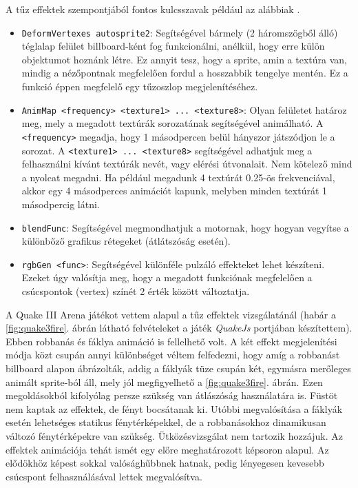 A tűz effektek szempontjából fontos kulcsszavak például az alábbiak \cite{quake3shaderManual}.
\begin{itemize} 
\item
\texttt{DeformVertexes autosprite2}: Segítségével bármely (2 háromszögből álló) téglalap felület billboard-ként fog funkcionálni, anélkül, hogy erre külön objektumot hoznánk létre. Ez annyit tesz, hogy a sprite, amin a textúra van, mindig a nézőpontnak megfelelően fordul a hosszabbik tengelye mentén. Ez a funkció éppen megfelelő egy tűzoszlop megjelenítéséhez.
\item
\texttt{AnimMap <frequency> <texture1> ... <texture8>}: Olyan felületet határoz meg, mely a megadott textúrák sorozatának segítségével animálható. A \texttt{<frequency>} megadja, hogy 1 másodpercen belül hányszor játszódjon le a sorozat. A \texttt{<texture1> ... <texture8>} segítségével adhatjuk meg a felhasználni kívánt textúrák nevét, vagy elérési útvonalait. Nem kötelező mind a nyolcat megadni. Ha például megadunk 4 textúrát 0.25-ös frekvenciával, akkor egy 4 másodperces animációt kapunk, melyben minden textúrát 1 másodpercig látni. 
\item
\texttt{blendFunc}: Segítségével megmondhatjuk a motornak, hogy hogyan vegyítse a különbőző grafikus rétegeket (átlátszóság esetén).
\item
\texttt{rgbGen <func>}: Segítségével különféle pulzáló effekteket lehet készíteni. Ezeket úgy valósítja meg, hogy a megadott funkciónak megfelelően a csúcspontok (vertex) színét 2 érték között változtatja.
\end{itemize}

A Quake III Arena játékot vettem alapul a tűz effektek vizsgálatánál (habár a \ref{fig:quake3fire}. ábrán látható felvételeket a játék \textit{QuakeJs} portjában készítettem). Ebben robbanás és fáklya animáció is fellelhető volt. A két effekt megjelenítési módja közt csupán annyi különbséget véltem felfedezni, hogy amíg a robbanást billboard alapon ábrázolták, addig a fáklyák tüze csupán két, egymásra merőleges animált sprite-ból áll, mely jól megfigyelhető a \ref{fig:quake3fire}. ábrán. Ezen megoldásokból kifolyólag persze szükség van átlászóság használatára is. Füstöt nem kaptak az effektek, de fényt bocsátanak ki. Utóbbi megvalósítása a fáklyák esetén lehetséges statikus fénytérképekkel, de a robbanásokhoz dinamikusan változó fénytérképekre van szükség. Ütközésvizsgálat nem tartozik hozzájuk. Az effektek animációja tehát ismét egy előre meghatározott képsoron alapul. Az elődökhöz képest sokkal valósághűbbnek hatnak, pedig lényegesen kevesebb csúcspont felhasználásával lettek megvalósítva.

